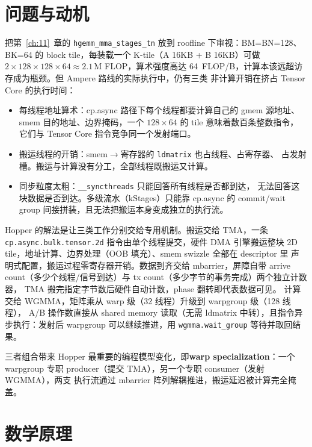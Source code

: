 \section{问题与动机}

把第~\ref{ch:11}~章的 \texttt{hgemm\_\allowbreak{}mma\_\allowbreak{}stages\_\allowbreak{}tn} 放到 roofline 下审视：BM=BN=128、
BK=64 的 block tile，每装载一个 K-tile（A 16KB + B 16KB）可做
$2 \times 128 \times 128 \times 64 \approx 2.1\,\mathrm{M}$ FLOP，算术强度高达
64~FLOP/B，计算本该远超访存成为瓶颈。但 Ampere 路线的实际执行中，仍有三类
非计算开销在挤占 Tensor Core 的执行时间：

\begin{itemize}
  \item 每线程地址算术：cp.async 路径下每个线程都要计算自己的 gmem 源地址、
        smem 目的地址、边界掩码，一个 $128 \times 64$ 的 tile 意味着数百条整数指令，
        它们与 Tensor Core 指令竞争同一个发射端口。
  \item 搬运线程的开销：smem$\to$寄存器的 \texttt{ldmatrix} 也占线程、占寄存器、
        占发射槽。搬运与计算没有分工，全部线程既搬运又计算。
  \item 同步粒度太粗：\texttt{\_\allowbreak{}\_\allowbreak{}syncthreads} 只能回答所有线程是否都到达，
        无法回答这块数据是否到达。多级流水（kStages）只能靠 cp.async 的
        commit/wait group 间接拼装，且无法把搬运本身变成独立的执行流。
\end{itemize}

Hopper 的解法是让三类工作分别交给专用机制。搬运交给 TMA，一条
\texttt{cp.\allowbreak{}async.\allowbreak{}bulk.\allowbreak{}tensor.2d} 指令由单个线程提交，硬件 DMA 引擎搬运整块
2D tile，地址计算、边界处理（OOB 填充）、smem swizzle 全部在 descriptor 里
声明式配置，搬运过程零寄存器开销。数据到齐交给 mbarrier，屏障自带
arrive count（多少个线程/信号到达）与 tx count（多少字节的事务完成）两个独立计数器，
TMA 搬完指定字节数后硬件自动计数，phase 翻转即代表数据可见。
计算交给 WGMMA，矩阵乘从 warp 级（32 线程）升级到 warpgroup 级（128 线程），
A/B 操作数直接从 shared memory 读取（无需 ldmatrix 中转），且指令异步执行：发射后
warpgroup 可以继续推进，用 \texttt{wgmma.\allowbreak{}wait\_\allowbreak{}group} 等待并取回结果。

三者组合带来 Hopper 最重要的编程模型变化，即\textbf{warp specialization}：一个
warpgroup 专职 producer（提交 TMA），另一个专职 consumer（发射 WGMMA），两支
执行流通过 mbarrier 阵列解耦推进，搬运延迟被计算完全掩盖。

\section{数学原理}

